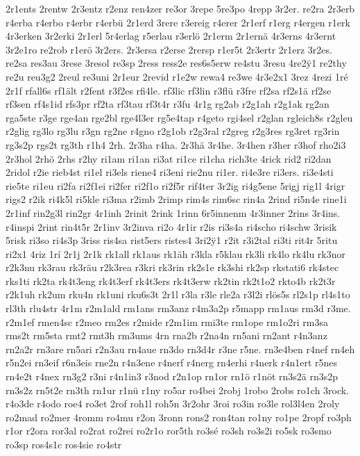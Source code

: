 {2r1ents
2rentw
2r3entz
r2enz
ren4zer
re3or
3repe
5re3po
4repp
3r2er.
re2ra
2r3erb
r4erba
r4erbo
r4erbr
r4erbü
2r1erd
3rere
r3ereig
r4erer
2r1erf
r1erg
r4ergen
r1erk
4r3erken
3r2erki
2r1erl
5r4erlag
r5erlau
r3erlö
2r1erm
2r1ernä
4r3erns
4r3ernt
3r2e1ro
re2rob
r1erö
3r2ers.
2r3ersa
r2erse
2rersp
r1er5t
2r3ertr
2r1erz
3r2es.
re2sa
res3au
3rese
3resol
re3sp
2ress
ress2e
res6s5erw
re4stu
3resu
4re2^^ff1
re2thy
re2u
reu3g2
2reul
re3uni
2r1eur
2revid
r1e2w
rewa4
re3we
4r3e2x1
3rez
4rezi
1ré
2r1f
rfall6s
rf1ält
r2fent
r3f2es
rfi4le.
rf3lic
rf3lin
r3flü
r3fre
rf2sa
rf2s1ä
rf2se
rf3sen
rf4s1id
rfs3pr
rf2ta
rf3tau
rf3t4r
r3fu
4r1g
rg2ab
r2g1ah
r2g1ak
rg2an
rga5ste
r3ge
rge4an
rge2bl
rge4l3er
rg5e4tap
r4geto
rgi4sel
r2glan
rgleich8s
r2gleu
r2glig
rg3lo
rg3lu
r3gn
rg2ne
r4gno
r2g1ob
r2g3ral
r2greg
r2g3res
rg3ret
rg3rin
rg3s2p
rgs2t
rg3th
r1h4
2rh.
2r3ha
r4ha.
2r3hä
3r4he.
3r4hen
r3her
r3hof
rho2i3
2r3hol
2rhö
2rhs
r2hy
ri1am
ri1an
ri3at
ri1ce
ri1cha
rich3te
4rick
rid2
ri2dan
2ridol
r2ie
rieb4st
ri1el
ri3els
riene4
ri3eni
rie2nu
ri1er.
ri4e3re
ri3ers.
ri3e4sti
rie5te
ri1eu
ri2fa
ri2f1ei
ri2fer
ri2f1o
ri2f5r
rif4ter
3r2ig
ri4g5ene
5rigj
rig1l
4rigr
rigs2
r2ik
ri4k5l
ri5kle
ri3ma
r2imb
2rimp
rim4s
rim6sc
rin4a
2rind
ri5n4e
rine1i
2r1inf
rin2g3l
rin2gr
4r1inh
2rinit
2rink
1rinn
6r5innenm
4r3inner
2rins
3r4ins.
r4inspi
2rint
rin4t5r
2r1inv
3r2inva
ri2o
4r1ir
r2is
ri3s4a
ri4scho
ri4schw
3risik
5risk
ri3so
ri4s3p
3riss
ris4sa
rist5ers
ristes4
3ri2^^ff1
r2it
r3i2tal
ri3ti
rit4r
5ritu
ri2x1
4riz
1rí
2r1j
2r1k
rk1all
rk1aus
rk1äh
r3kla
r5klau
rk3li
rk4lo
rk4lu
rk3nor
r2k3nu
rk3rau
rk3räu
r2k3rea
r3kri
rk3rin
rk2s1e
rk3shi
rk2sp
rkstati6
rk4stec
rks1ti
rk2ta
rk4t3eng
rk4t3erf
rk4t3ers
rk4t3erw
rk2tin
rk2t1o2
rkto4b
rk2t3r
r2k1uh
rk2um
rku4n
rk1uni
rku6s3t
2r1l
r3la
r3le
rle2a
r3l2i
rlös5s
rl2s1p
rl4s1to
rl3th
rlu4str
4r1m
r2m1ald
rm1ans
rm3anz
r4m3a2p
r5mapp
rm1aus
rm3d
r3me.
r2m1ef
rmen4sc
r2meo
rm2es
r2mide
r2m1im
rmi3te
rm1ope
rm1o2ri
rm3sa
rms2t
rm5sta
rmt2
rmt3h
rm3ums
4rn
rna2b
r2na4n
rn5ani
rn2ant
r4n3anz
rn2a2r
rn3are
rn5ari
r2n3au
rn4aue
rn3do
rn3d4r
r3ne
r5ne.
rn3e4ben
r4nef
rn4eh
r5n2ei
rn3eif
r6n3eis
rne2n
r4n3ene
r4nerf
r4nerg
rn4erhi
r4nerk
r4n1ert
r5nes
rn4e2t
r4nex
rn3g2
r3ni
r4n1in3
r3nod
r2n1op
rn1or
rn1ö
r1nöt
rn3s2ä
rn3s2p
rn3s2z
rn5t2e
rn3th
rn1ur
r1nü
r1ny
ro5ar
ro4bei
2robj
1robo
2robs
ro1ch
3rock.
r4o3de
r4odo
roe4
ro3et
2rof
roh1l
roh5n
3r2ohr
3roi
ro3in
ro3le
rol3l4en
2roly
ro2mad
ro2mer
4romm
ro4mu
r2on
3ronn
rons2
ron4tan
ro1ny
ro1pe
2ropf
ro3ph
r1or
r2ora
ror3al
ro2rat
ro2rei
ro2r1o
ror5th
ro3sé
ro3sh
ro3s2i
ro5sk
ro3smo
ro3sp
ros4s1c
ros4sie
ro4str
}
